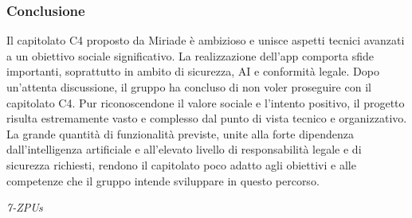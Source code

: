 \documentclass[a4paper,12pt]{article}
\begin{document}
\subsubsection*{Conclusione}
Il capitolato C4 proposto da Miriade è ambizioso e unisce aspetti tecnici avanzati a un obiettivo sociale significativo.  
La realizzazione dell’app comporta sfide importanti, soprattutto in ambito di sicurezza, AI e conformità legale.
Dopo un’attenta discussione, il gruppo ha concluso di non voler proseguire con il capitolato C4.  
Pur riconoscendone il valore sociale e l’intento positivo, il progetto risulta estremamente vasto e complesso dal punto di vista tecnico e organizzativo.  
La grande quantità di funzionalità previste, unite alla forte dipendenza dall'intelligenza artificiale e all’elevato livello di responsabilità legale e di sicurezza richiesti, rendono il capitolato poco adatto agli obiettivi e alle competenze che il gruppo intende sviluppare in questo percorso.

\vspace{0.5cm}

\vfill
\begin{flushright}
    \textit{7-ZPUs}
\end{flushright}
\end{document}
